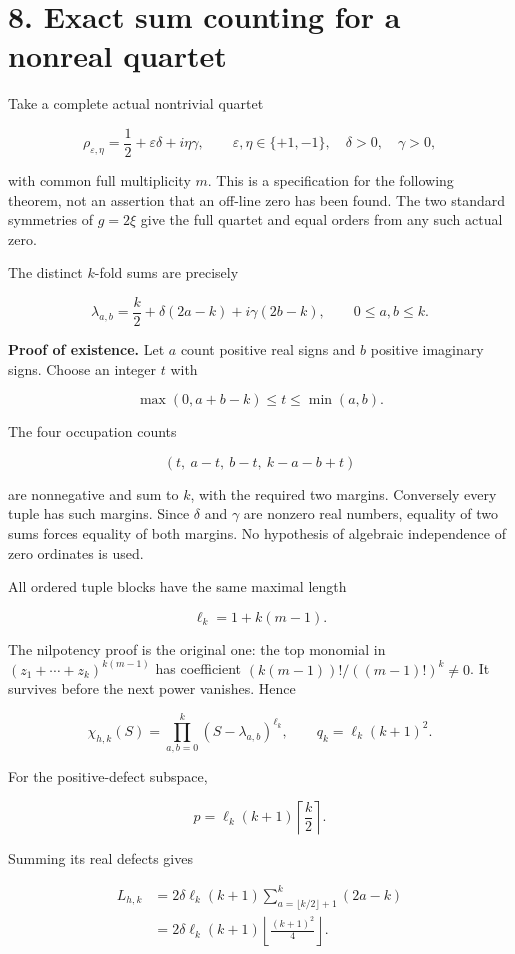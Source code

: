 \documentclass[
  11pt,
]{article}
\begin{document}
\section{8. Exact sum counting for a nonreal
quartet}\label{exact-sum-counting-for-a-nonreal-quartet}

Take a complete actual nontrivial quartet

\[
\rho_{\varepsilon,\eta}
=\frac12+\varepsilon\delta+i\eta\gamma,
\qquad \varepsilon,\eta\in\{+1,-1\},\quad
\delta>0,\quad\gamma>0,
\]

with common full multiplicity \(m\). This is a specification for the
following theorem, not an assertion that an off-line zero has been
found. The two standard symmetries of \(g=2\xi\) give the full quartet
and equal orders from any such actual zero.

The distinct \(k\)-fold sums are precisely

\[
\boxed{
\lambda_{a,b}
=\frac k2+\delta(2a-k)+i\gamma(2b-k),
\qquad 0\leq a,b\leq k.
}
\]

\textbf{Proof of existence.} Let \(a\) count positive real signs and
\(b\) positive imaginary signs. Choose an integer \(t\) with

\[
\max(0,a+b-k)\leq t\leq\min(a,b).
\]

The four occupation counts

\[
(t,\ a-t,\ b-t,\ k-a-b+t)
\]

are nonnegative and sum to \(k\), with the required two margins.
Conversely every tuple has such margins. Since \(\delta\) and \(\gamma\)
are nonzero real numbers, equality of two sums forces equality of both
margins. No hypothesis of algebraic independence of zero ordinates is
used.

All ordered tuple blocks have the same maximal length

\[
\ell_k=1+k(m-1).
\]

The nilpotency proof is the original one: the top monomial in
\((z_1+\cdots+z_k)^{k(m-1)}\) has coefficient
\((k(m-1))!/((m-1)!)^k\ne0\). It survives before the next power
vanishes. Hence

\[
\boxed{
\chi_{h,k}(S)=\prod_{a,b=0}^k(S-\lambda_{a,b})^{\ell_k},
\qquad q_k=\ell_k(k+1)^2.
}
\]

For the positive-defect subspace,

\[
p=\ell_k(k+1)\left\lceil\frac k2\right\rceil.
\]

Summing its real defects gives

\[
\begin{aligned}
L_{h,k}
&=2\delta\ell_k(k+1)
\sum_{a=\lfloor k/2\rfloor+1}^{k}(2a-k)\\
&=2\delta\ell_k(k+1)
\left\lfloor\frac{(k+1)^2}{4}\right\rfloor.
\end{aligned}
\]
\end{document}
